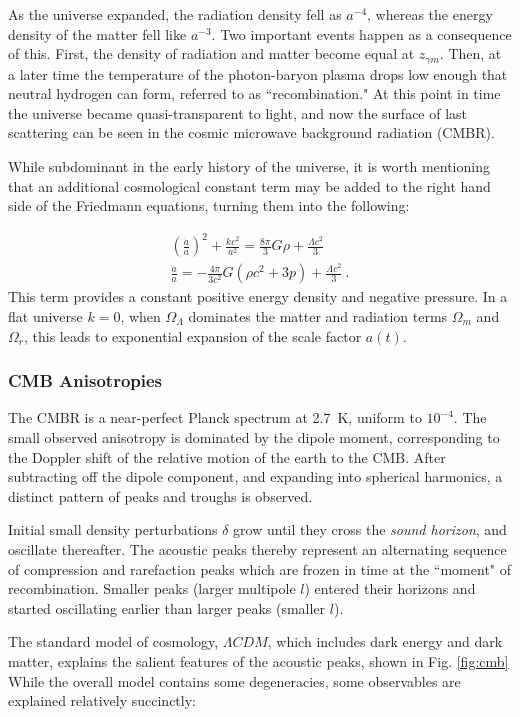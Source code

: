 As the universe expanded, the radiation density fell as $a^{-4}$, whereas the energy density of the matter fell like $a^{-3}$. 
Two important events happen as a consequence of this. 
First, the density of radiation and matter become equal at $z_{\gamma m}$.
Then, at a later time the temperature of the photon-baryon plasma drops low enough that neutral hydrogen can form, referred to as ``recombination."
At this point in time the universe became quasi-transparent to light, and now the surface of last scattering can be seen in the cosmic microwave background radiation (CMBR).

While subdominant in the early history of the universe, it is worth mentioning that an additional cosmological constant term may be added to the right hand side of the Friedmann equations, turning them into the following: 

\begin{align}
        (\frac{\dot a}{a})^2 + \frac{k c^2}{a^2} = \frac{8 \pi}{3} {G \rho} + \frac{\Lambda c^2 }{3} \\
 \frac{\ddot a}{a}  = -\frac{4 \pi}{3c^2} G (\rho c^2 + 3p)  + \frac{\Lambda c^2 }{3}~.
\end{align}
\noindent
This term provides a constant positive energy density and negative pressure.
In a flat universe $k=0$, when $\Omega_\Lambda$ dominates the matter and radiation terms $\Omega_m$ and $\Omega_r$, this leads to exponential expansion of the scale factor $a(t)$.

\subsubsection{CMB Anisotropies}
The CMBR is a near-perfect Planck spectrum at 2.7~K, uniform to $10^{-4}$.
The small observed anisotropy is dominated by the dipole moment, corresponding to the Doppler shift of the relative motion of the earth to the CMB.
After subtracting off the dipole component, and expanding into spherical harmonics, a distinct pattern of peaks and troughs is observed. 

Initial small density perturbations $\delta$ grow until they cross the \textit{sound horizon}, and  oscillate thereafter. 
The acoustic peaks thereby represent an alternating sequence of compression and rarefaction peaks which are frozen in time at the ``moment" of recombination.
Smaller peaks (larger multipole $l$) entered their horizons and started oscillating earlier than larger peaks (smaller $l$).

The standard model of cosmology, $\Lambda CDM$, which includes dark energy and dark matter, explains the salient features of the acoustic peaks, shown in Fig. \ref{fig:cmb}
While the overall model contains some degeneracies, some observables are explained relatively succinctly:

